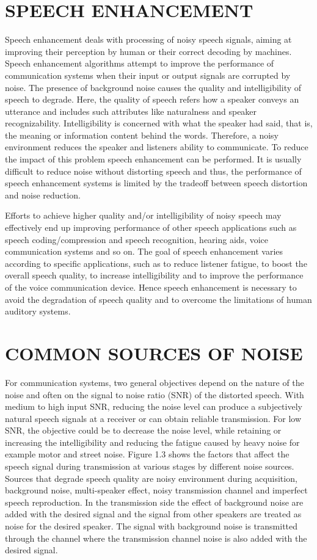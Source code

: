 \documentclass[a4paper,12pt]{report} %
\begin{document}
\section{SPEECH ENHANCEMENT}
Speech enhancement deals with processing of noisy speech signals, aiming at improving their perception by human or their correct decoding by machines. Speech enhancement algorithms attempt to improve the performance of communication systems when their input or output signals are corrupted by noise. The presence of background noise causes the quality and intelligibility of speech to degrade. Here, the quality of speech refers how a speaker conveys an utterance and includes such attributes like naturalness and speaker recognizability. Intelligibility is concerned with what the speaker had said, that is, the meaning or information content behind the words. Therefore, a noisy environment reduces the speaker and listeners ability to communicate. To reduce the impact of this problem speech enhancement can be performed. It is usually difficult to reduce noise without distorting speech and thus, the performance of speech enhancement systems is limited by the tradeoff between speech distortion and noise reduction.\par
Efforts to achieve higher quality and/or intelligibility of noisy speech may effectively end up improving performance of other speech applications such as speech coding/compression and speech recognition, hearing aids, voice communication systems and so on. The goal of speech enhancement varies according to specific applications, such as to reduce listener fatigue, to boost the overall speech quality, to increase intelligibility and to improve the performance of the voice communication device. Hence speech enhancement is necessary to avoid the degradation of speech quality and to overcome the limitations of human auditory systems.
\section{COMMON SOURCES OF NOISE}
For communication systems, two general objectives depend on the nature of the noise and often on the signal to noise ratio (SNR) of the distorted speech. With medium to high input SNR, reducing the noise level can produce a subjectively natural speech signals at a receiver or can obtain reliable transmission. For low SNR, the objective could be to decrease the noise level, while retaining or increasing the intelligibility and reducing the fatigue caused by heavy noise for example motor and street noise. Figure 1.3 shows the factors that affect the speech signal during transmission at various stages by different noise sources. Sources that degrade speech quality are noisy environment during acquisition, background noise, multi-speaker effect, noisy transmission channel and imperfect speech reproduction. In the transmission side the effect of background noise are added with the desired signal and the signal from other speakers are treated as noise for the desired speaker. The signal with background noise is transmitted through the channel where the transmission channel noise is also added with the desired signal.
\end{document}
